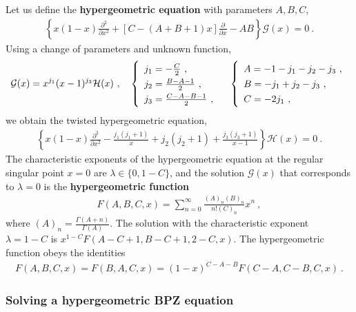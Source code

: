 \documentclass[12pt, a4paper, notitlepage, twoside]{report}
\numberwithin{equation}{section}
\theoremstyle{break}
\begin{document}
 Let us define the \textbf{\boldmath hypergeometric equation} with parameters $A,B,C$, 
\begin{align}
 \left\{ x(1-x) \frac{\partial^2}{\partial x^2} +\left[C-(A+B+1)x\right]{\frac{\partial}{\partial x}} - AB \right\} \mathcal{G}(x)= 0\ .
\label{dzp}
\end{align}
Using a change of parameters and unknown function,
\begin{align}
\mathcal{G}(x) = x^{j_1} (x-1)^{j_3} \mathcal{H}(x)
 \ , \quad \renewcommand{\arraystretch}{1.3}\left\{\begin{array}{l}  j_1 = -\frac{C}{2} \ , \\ j_2=\frac{B-A-1}{2} \ , \\  j_3= \frac{C-A-B-1}{2}\ , \end{array}\right.    
\quad \left\{\begin{array}{l}  A = -1-j_1-j_2-j_3\ , \\ B = -j_1+j_2-j_3\ , \\ C = -2j_1\ , \end{array}\right. 
\end{align}
we obtain the twisted hypergeometric equation,
\begin{align}
 \left\{ x(1-x) \frac{\partial^2}{\partial x^2}  -\frac{j_1(j_1+1)}{x}+ j_2(j_2+1)+\frac{j_3(j_3+1)}{x-1}\right\} \mathcal{H}(x) = 0\ .
\label{hj}
\end{align}
The characteristic exponents of the hypergeometric equation at the regular singular point $x=0$ are $\lambda\in \{0,1-C\}$, and the solution $\mathcal{G}(x)$ that corresponds to $\lambda=0$
 is the \textbf{\boldmath hypergeometric function}
\begin{align}
 F(A,B,C,x) = \sum_{n=0}^\infty \frac{(A)_n(B)_n}{n!(C)_n}x^n\ ,
\label{fsn}
\end{align}
where $(A)_n = \frac{\Gamma(A+n)}{\Gamma(A)}$.
The solution with the characteristic exponent $\lambda=1-C$ is $x^{1-C}F(A-C+1,B-C+1,2-C,x)$.
The hypergeometric function obeys the identities 
\begin{align}
 F(A,B,C,x) = F(B,A,C,x) = (1-x)^{C-A-B} F(C-A,C-B,C,x)\ .
\label{fff}
\end{align}

\subsubsection{Solving a hypergeometric BPZ equation}
\end{document}
